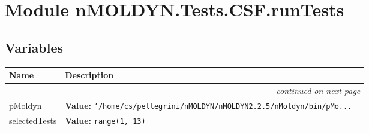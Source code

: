 %
%
%


\section{Module nMOLDYN.Tests.CSF.runTests}

    \label{nMOLDYN:Tests:CSF:runTests}


  \subsection{Variables}

    \vspace{-1cm}
\hspace{\varindent}\begin{longtable}{|p{\varnamewidth}|p{\vardescrwidth}|l}
\cline{1-2}
\cline{1-2} \centering \textbf{Name} & \centering \textbf{Description}& \\
\cline{1-2}
\endhead\cline{1-2}\multicolumn{3}{r}{\small\textit{continued on next page}}\\\endfoot\cline{1-2}
\endlastfoot\raggedright p\-M\-o\-l\-d\-y\-n\- & \raggedright \textbf{Value:} 
{\tt '/home/cs/pellegrini/nMOLDYN/nMOLDYN2.2.5/nMoldyn/bin/pMo\texttt{...}}&\\
\cline{1-2}
\raggedright s\-e\-l\-e\-c\-t\-e\-d\-T\-e\-s\-t\-s\- & \raggedright \textbf{Value:} 
{\tt range(1, 13)}&\\
\cline{1-2}
\end{longtable}

